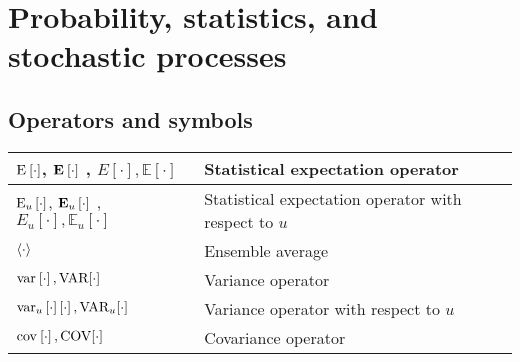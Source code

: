 \documentclass{article}
\begin{document}
\section{Probability, statistics, and stochastic processes}
\subsection{Operators and symbols}
\begin{xltabular}{\textwidth}{XX}
	\(\E{\cdot}\), \(\nossekE{\cdot}\) \cite{nossekAdaptiveArraySignal2015}, \(E\left[ \cdot \right], \mathbb{E}\left[ \cdot \right]\)           & Statistical expectation operator \cite{dinizAdaptiveFilteringAlgorithms2002}                                                                                            \\ \hline
	\(\E[u]{\cdot}\), \(\nossekE[u]{\cdot}\) \cite{nossekAdaptiveArraySignal2015}, \(E_u\left[ \cdot \right], \mathbb{E}_u\left[ \cdot \right]\) & Statistical expectation operator with respect to \(u\)                                                                                                                  \\ \hline
	\(\expval{\cdot}\)                                                                                                                           & Ensemble average                                                                                                                                                        \\ \hline
	\(\var{\cdot}, \textnormal{VAR}[\cdot]\)                                                                                                     & Variance operator \cite{haykinAdaptiveFilterTheory2002,leon-garciaProbabilityStatisticsRandom2007,proakisDigitalCommunications2007,bishopPatternRecognitionMachine2006} \\ \hline
	\(\var[u]{\cdot} \left[ \cdot \right], \textnormal{VAR}_u[\cdot]\)                                                                           & Variance operator with respect to \(u\)                                                                                                                                 \\ \hline
	\(\cov{\cdot}, \textnormal{COV}[\cdot]\)                                                                                                     & Covariance operator \cite{bishopPatternRecognitionMachine2006}                                                                                                          \\ \hline

\end{xltabular}
\end{document}
